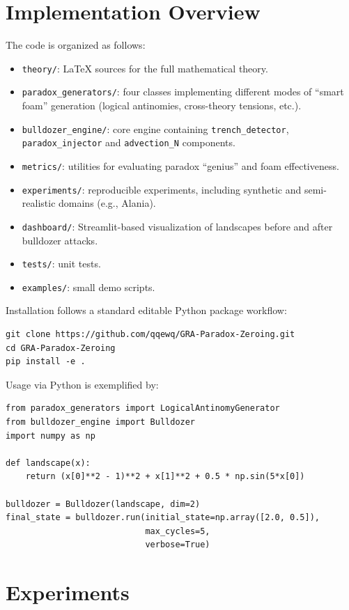 \documentclass[11pt]{article}
\begin{document}
\section{Implementation Overview}

The code is organized as follows:
\begin{itemize}
    \item \texttt{theory/}: LaTeX sources for the full mathematical theory.
    \item \texttt{paradox\_generators/}: four classes implementing different modes of ``smart foam'' generation (logical antinomies, cross-theory tensions, etc.).
    \item \texttt{bulldozer\_engine/}: core engine containing \texttt{trench\_detector}, \texttt{paradox\_injector} and \texttt{advection\_N} components.
    \item \texttt{metrics/}: utilities for evaluating paradox ``genius'' and foam effectiveness.
    \item \texttt{experiments/}: reproducible experiments, including synthetic and semi-realistic domains (e.g., Alania).
    \item \texttt{dashboard/}: Streamlit-based visualization of landscapes before and after bulldozer attacks.
    \item \texttt{tests/}: unit tests.
    \item \texttt{examples/}: small demo scripts.
\end{itemize}

Installation follows a standard editable Python package workflow:
\begin{verbatim}
git clone https://github.com/qqewq/GRA-Paradox-Zeroing.git
cd GRA-Paradox-Zeroing
pip install -e .
\end{verbatim}
Usage via Python is exemplified by:
\begin{verbatim}
from paradox_generators import LogicalAntinomyGenerator
from bulldozer_engine import Bulldozer
import numpy as np

def landscape(x):
    return (x[0]**2 - 1)**2 + x[1]**2 + 0.5 * np.sin(5*x[0])

bulldozer = Bulldozer(landscape, dim=2)
final_state = bulldozer.run(initial_state=np.array([2.0, 0.5]),
                            max_cycles=5,
                            verbose=True)
\end{verbatim}

\section{Experiments}
\end{document}
